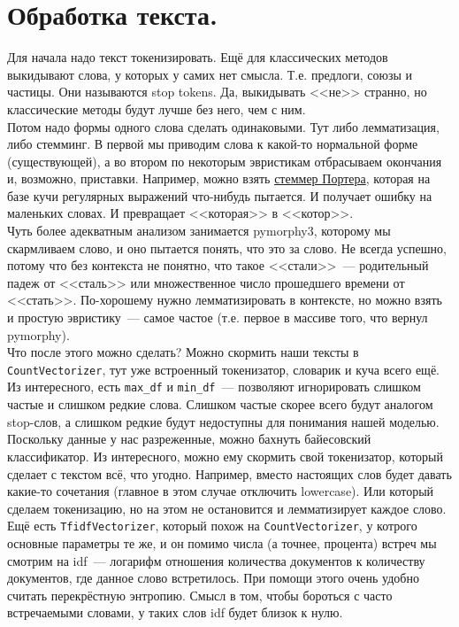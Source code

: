 \documentclass{article}
\begin{document}
    \section{Обработка текста.}
    Для начала надо текст токенизировать. Ещё для классических методов выкидывают слова, у которых у самих нет смысла. Т.е. предлоги, союзы и частицы. Они называются stop tokens. Да, выкидывать <<не>> странно, но классические методы будут лучше без него, чем с ним.\\
    Потом надо формы одного слова сделать одинаковыми. Тут либо лемматизация, либо стемминг. В первой мы приводим слова к какой-то нормальной форме (существующей), а во втором по некоторым эвристикам отбрасываем окончания и, возможно, приставки. Например, можно взять \href{http://snowball.tartarus.org/algorithms/russian/stemmer.html}{стеммер Портера}, которая на базе кучи регулярных выражений что-нибудь пытается. И получает ошибку на маленьких словах. И превращает <<которая>> в <<котор>>.\\
    Чуть более адекватным анализом занимается pymorphy3, которому мы скармливаем слово, и оно пытается понять, что это за слово. Не всегда успешно, потому что без контекста не понятно, что такое <<стали>>~--- родительный падеж от <<сталь>> или множественное число прошедшего времени от <<стать>>. По-хорошему нужно лемматизировать в контексте, но можно взять и простую эвристику~--- самое частое (т.е. первое в массиве того, что вернул pymorphy).\\
    Что после этого можно сделать? Можно скормить наши тексты в \Verb|CountVectorizer|, тут уже встроенный токенизатор, словарик и куча всего ещё. Из интересного, есть \Verb|max_df| и \Verb|min_df|~--- позволяют игнорировать слишком частые и слишком редкие слова. Слишком частые скорее всего будут аналогом stop-слов, а слишком редкие будут недоступны для понимания нашей моделью. Поскольку данные у нас разреженные, можно бахнуть байесовский классификатор. Из интересного, можно ему скормить свой токенизатор, который сделает с текстом всё, что угодно. Например, вместо настоящих слов будет давать какие-то сочетания (главное в этом случае отключить lowercase). Или который сделаем токенизацию, но на этом не остановится и лемматизирует каждое слово.\\
    Ещё есть \Verb|TfidfVectorizer|, который похож на \Verb|CountVectorizer|, у котрого основные параметры те же, и он помимо числа (а точнее, процента) встреч мы смотрим на idf~--- логарифм отношения количества документов к количеству документов, где данное слово встретилось. При помощи этого очень удобно считать перекрёстную энтропию. Смысл в том, чтобы бороться с часто встречаемыми словами, у таких слов idf будет близок к нулю.
\end{document}
